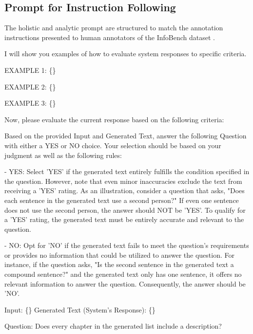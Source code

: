 
\subsection{Prompt for Instruction Following}
\label{sec:if_prompt_appendix}
The holistic and analytic prompt are structured to match the annotation instructions presented to human annotators of the InfoBench dataset \citep{qin-etal-2024-infobench}.

\begin{tcolorbox}[title=Evaluation Prompt,breakable]
    I will show you examples of how to evaluate system responses to specific criteria.

EXAMPLE 1: \{\}

EXAMPLE 2: \{\}

EXAMPLE 3: \{\}

Now, please evaluate the current response based on the following criteria:

Based on the provided Input and Generated Text, answer the following Question with either a YES or NO choice. Your selection should be based on your judgment as well as the following rules: 

- YES: Select 'YES' if the generated text entirely fulfills the condition specified in the question. However, note that even minor inaccuracies exclude the text from receiving a 'YES' rating. As an illustration, consider a question that asks, "Does each sentence in the generated text use a second person?" If even one sentence does not use the second person, the answer should NOT be 'YES'. To qualify for a 'YES' rating, the generated text must be entirely accurate and relevant to the question. 

- NO: Opt for 'NO' if the generated text fails to meet the question's requirements or provides no information that could be utilized to answer the question. For instance, if the question asks, "Is the second sentence in the generated text a compound sentence?" and the generated text only has one sentence, it offers no relevant information to answer the question. Consequently, the answer should be 'NO'.

Input: \{\}
Generated Text (System's Response): \{\}

Question: Does every chapter in the generated list include a description?
\end{tcolorbox}


